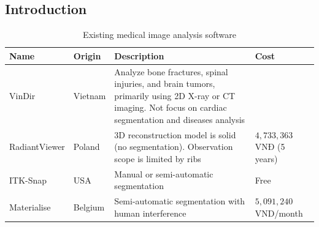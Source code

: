 \documentclass{article}
\begin{document}
\begin{multicols}{2} 
\section{Introduction}

\begin{table}[]
    \centering
    \begin{tabular}{p{2.5cm}|p{2cm}|p{6cm}|p{2.5cm}}
         \textbf{Name} & \textbf{Origin} & \textbf{Description} & \textbf{Cost} \\
         \hline
         VinDir & Vietnam & Analyze bone fractures, spinal injuries, and brain tumors, primarily using 2D X-ray or CT imaging. Not focus on cardiac segmentation and diseases analysis\\
         \hline
         RadiantViewer & Poland & 3D reconstruction model is solid (no segmentation). Observation scope is limited by ribs & $4,733,363$ VNĐ (5 years) \\
         \hline
         ITK-Snap & USA & Manual or semi-automatic segmentation & Free \\
         Materialise & Belgium & Semi-automatic segmentation with human interference & $5,091,240$ VND/month 
    \end{tabular}
    \caption{Existing medical image analysis software}
    \label{tab:1}
\end{table}


\end{multicols}
\end{document}
